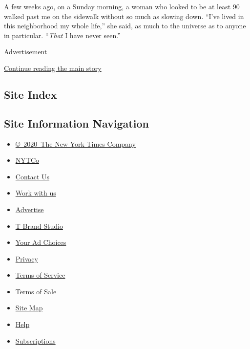 A few weeks ago, on a Sunday morning, a woman who looked to be at least
90 walked past me on the sidewalk without so much as slowing down.
``I've lived in this neighborhood my whole life,'' she said, as much to
the universe as to anyone in particular. ``\emph{That} I have never
seen.''

Advertisement

\protect\hyperlink{after-bottom}{Continue reading the main story}

\hypertarget{site-index}{%
\subsection{Site Index}\label{site-index}}

\hypertarget{site-information-navigation}{%
\subsection{Site Information
Navigation}\label{site-information-navigation}}

\begin{itemize}
\tightlist
\item
  \href{https://help.nytimes.com/hc/en-us/articles/115014792127-Copyright-notice}{©~2020~The
  New York Times Company}
\end{itemize}

\begin{itemize}
\tightlist
\item
  \href{https://www.nytco.com/}{NYTCo}
\item
  \href{https://help.nytimes.com/hc/en-us/articles/115015385887-Contact-Us}{Contact
  Us}
\item
  \href{https://www.nytco.com/careers/}{Work with us}
\item
  \href{https://nytmediakit.com/}{Advertise}
\item
  \href{http://www.tbrandstudio.com/}{T Brand Studio}
\item
  \href{https://www.nytimes.com/privacy/cookie-policy\#how-do-i-manage-trackers}{Your
  Ad Choices}
\item
  \href{https://www.nytimes.com/privacy}{Privacy}
\item
  \href{https://help.nytimes.com/hc/en-us/articles/115014893428-Terms-of-service}{Terms
  of Service}
\item
  \href{https://help.nytimes.com/hc/en-us/articles/115014893968-Terms-of-sale}{Terms
  of Sale}
\item
  \href{https://spiderbites.nytimes.com}{Site Map}
\item
  \href{https://help.nytimes.com/hc/en-us}{Help}
\item
  \href{https://www.nytimes.com/subscription?campaignId=37WXW}{Subscriptions}
\end{itemize}
